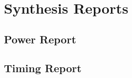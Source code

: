\chapter{Synthesis Reports}
\label{appendix1}

\section{Power Report}
	

\section{Timing Report}
	

